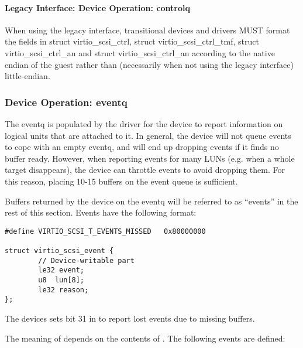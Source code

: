 \paragraph{Legacy Interface: Device Operation: controlq}\label{sec:Device Types / SCSI Host Device / Device Operation / Device Operation: controlq / Legacy Interface: Device Operation: controlq}

When using the legacy interface, transitional devices and drivers
MUST format the fields in struct virtio_scsi_ctrl, struct
virtio_scsi_ctrl_tmf, struct virtio_scsi_ctrl_an and struct
virtio_scsi_ctrl_an
according to the native endian of the guest rather than
(necessarily when not using the legacy interface) little-endian.


\subsubsection{Device Operation: eventq}\label{sec:Device Types / SCSI Host Device / Device Operation / Device Operation: eventq}

The eventq is populated by the driver for the device to report information on logical
units that are attached to it. In general, the device will not
queue events to cope with an empty eventq, and will end up
dropping events if it finds no buffer ready. However, when
reporting events for many LUNs (e.g. when a whole target
disappears), the device can throttle events to avoid dropping
them. For this reason, placing 10-15 buffers on the event queue
is sufficient.

Buffers returned by the device on the eventq will be referred to
as ``events'' in the rest of this section. Events have the
following format:

\begin{lstlisting}
#define VIRTIO_SCSI_T_EVENTS_MISSED   0x80000000

struct virtio_scsi_event {
        // Device-writable part
        le32 event;
        u8  lun[8];
        le32 reason;
};
\end{lstlisting}

The devices sets bit 31 in  to report lost events
due to missing buffers.

The meaning of  depends on the
contents of . The following events are defined:

